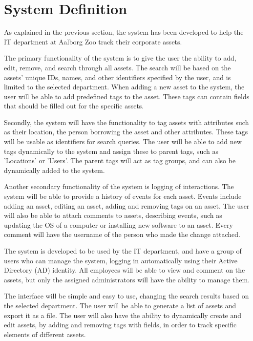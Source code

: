 \section{System Definition}
As explained in the previous section, the system has been developed to help the IT department at Aalborg Zoo track their corporate assets.
\par
The primary functionality of the system is to give the user the ability to add, edit, remove, and search through all assets. The search will be based on the assets' unique IDs, names, and other identifiers specified by the user, and is limited to the selected department. When adding a new asset to the system, the user will be able to add predefined tags to the asset. These tags can contain fields that should be filled out for the specific assets.
\par
Secondly, the system will have the functionality to tag assets with attributes such as their location, the person borrowing the asset and other attributes. These tags will be usable as identifiers for search queries. The user will be able to add new tags dynamically to the system and assign these to parent tags, such as 'Locations' or 'Users'. The parent tags will act as tag groups, and can also be dynamically added to the system. 
\par
Another secondary functionality of the system is logging of interactions. The system will be able to provide a history of events for each asset. Events include adding an asset, editing an asset, adding and removing tags on an asset. The user will also be able to attach comments to assets, describing events, such as updating the OS of a computer or installing new software to an asset. Every comment will have the username of the person who made the change attached.
\par
The system is developed to be used by the IT department, and have a group of users who can manage the system, logging in automatically using their Active Directory (AD) identity. All employees will be able to view and comment on the assets, but only the assigned administrators will have the ability to manage them. 
\par
The interface will be simple and easy to use, changing the search results based on the selected department. The user will be able to generate a list of assets and export it as a file. The user will also have the ability to dynamically create and edit assets, by adding and removing tags with fields, in order to track specific elements of different assets.
\par

